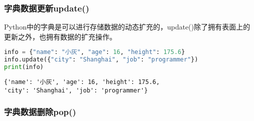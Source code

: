\begin{table}[H]
	\centering
	\caption{字典操作函数}
\end{table}

\subsubsection{字典数据更新update()}

Python中的字典是可以进行存储数据的动态扩充的，update()除了拥有表面上的更新之外，也拥有数据的扩充操作。\\


\begin{lstlisting}[language=Python]
info = {"name": "小灰", "age": 16, "height": 175.6}
info.update({"city": "Shanghai", "job": "programmer"})
print(info)
\end{lstlisting}

\begin{tcolorbox}
	\begin{verbatim}
{'name': '小灰', 'age': 16, 'height': 175.6,
'city': 'Shanghai', 'job': 'programmer'}
\end{verbatim}
\end{tcolorbox}

\subsubsection{字典数据删除pop()}

